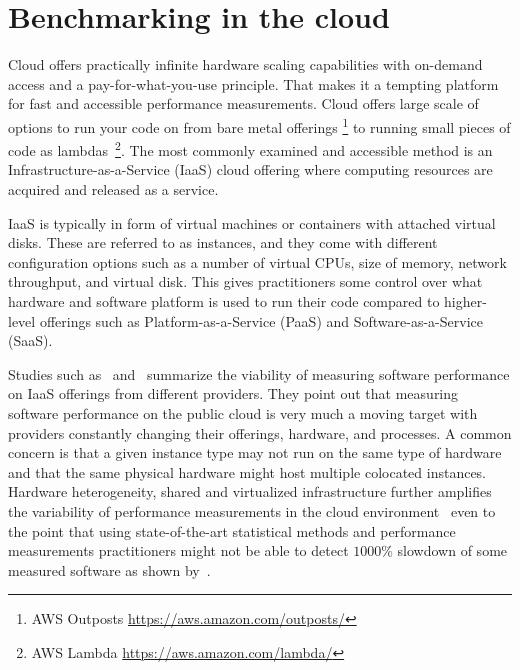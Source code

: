 \section{Benchmarking in the cloud}
Cloud offers practically infinite hardware scaling capabilities with on-demand access and a \mbox{pay-for-what-you-use} principle.
That makes it a tempting platform for fast and accessible performance measurements.
Cloud offers large scale of options to run your code on from bare metal offerings \footnote{AWS Outposts \url{https://aws.amazon.com/outposts/}} to running small pieces of code as lambdas~\footnote{AWS Lambda \url{https://aws.amazon.com/lambda/}}.
The most commonly examined and accessible method is an \mbox{Infrastructure-as-a-Service} (IaaS) cloud offering where computing resources are acquired and released as a service.

IaaS is typically in form of virtual machines or containers with attached virtual disks.
These are referred to as instances, and they come with different configuration options such as a number of virtual CPUs, size of memory, network throughput, and virtual disk.
This gives practitioners some control over what hardware and software platform is used to run their code compared to higher-level offerings such as Platform-as-a-Service (PaaS) and Software-as-a-Service (SaaS).

Studies such as~\citet{leitner2016patterns} and~\citet{laaber2019software} summarize the viability of measuring software performance on IaaS offerings from different providers.
They point out that measuring software performance on the public cloud is very much a moving target with providers constantly changing their offerings, hardware, and processes.
A common concern is that a given instance type may not run on the same type of hardware and that the same physical hardware might host multiple colocated instances.
Hardware heterogeneity, shared and virtualized infrastructure further amplifies the variability of performance measurements in the cloud environment~\cite{leitner2016patterns} even to the point that using state-of-the-art statistical methods and performance measurements practitioners might not be able to detect $1000\%$ slowdown of some measured software as shown by~\citet{laaber2019software}.

